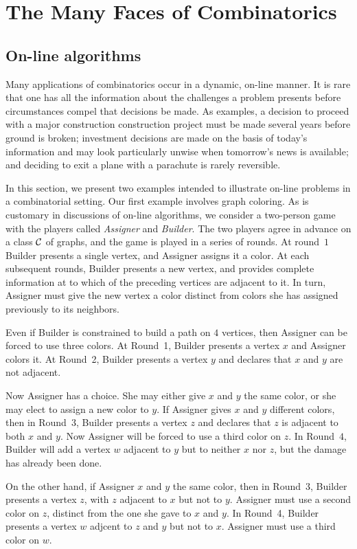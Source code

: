 
\chapter{The Many Faces of Combinatorics}\label{ch:kitchensink}

\section{On-line algorithms}

Many applications of combinatorics occur in a dynamic, on-line
manner.  It is rare that one has all the information about the
challenges a problem presents before circumstances compel that
decisions be made.  As examples, a decision to proceed with a
major construction construction project must be made several
years before ground is broken; investment decisions are made
on the basis of today's information and may look particularly
unwise when tomorrow's news is available; and deciding to
exit a plane with a parachute is rarely reversible.

In this section, we present two examples intended to illustrate
on-line problems in a combinatorial setting.  Our first example
involves graph coloring.  As is customary in discussions of 
on-line algorithms, we consider a two-person game with the players
called \textit{Assigner} and \textit{Builder}.  The two players
agree in advance on a class $\mathcal{C}$ of graphs, and the game
is played in a series of rounds.  At round~$1$ Builder presents
a single vertex, and Assigner assigns it a color.  At each
subsequent rounds, Builder presents a new vertex, and provides 
complete information at to which of the preceding vertices are 
adjacent to it.  In turn, Assigner must give the new vertex a 
color distinct from colors she has assigned previously to its 
neighbors.

\begin{example}\label{exa:P4}
Even if Builder is constrained to build a path on $4$ vertices,
then Assigner can be forced to use three colors.
At Round~1, Builder presents a vertex $x$ and Assigner colors 
it.  At Round~2, Builder presents a vertex $y$ and declares that 
$x$ and $y$ are not adjacent.

Now Assigner has a choice.  She may either give $x$ and $y$ the
same color, or she may elect to assign a new color to $y$.
If Assigner gives $x$ and $y$ different colors, then in Round~3, 
Builder presents a vertex $z$ and declares that $z$ is adjacent to 
both $x$ and $y$.  Now  Assigner will be forced to use a third 
color on $z$.  In Round~$4$, Builder will add a vertex $w$ adjacent
to $y$ but to neither $x$ nor $z$, but the damage has already been
done.

On the other hand, if Assigner $x$ and $y$ the same color, then 
in Round~3, Builder presents a vertex $z$, with $z$ adjacent to 
$x$ but not to $y$.  Assigner must use a second color on $z$, 
distinct from the one she gave to $x$ and $y$.  In Round~4, Builder 
presents a vertex $w$ adjcent to $z$ and $y$ but not to $x$.  Assigner 
must use a third color on $w$.  
\end{example}

